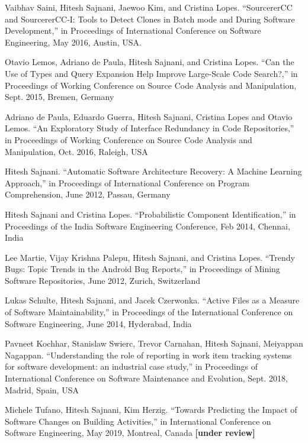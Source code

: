 \documentclass[a4paper]{article}
\begin{document}
\begin{small}
\begin{thebibliography}{}
Vaibhav Saini, Hitesh Sajnani, Jaewoo Kim, and Cristina Lopes. “SourcererCC and
SourcererCC-I: Tools to Detect Clones in Batch mode and During Software Development,”
in Proceedings of International Conference on Software Engineering, May 2016,
Austin, USA.

Otavio Lemos, Adriano de Paula, Hitesh Sajnani, and Cristina Lopes. “Can the Use of Types
and Query Expansion Help Improve Large-Scale Code Search?,” in Proceedings of
Working Conference on Source Code Analysis and Manipulation, Sept. 2015, Bremen,
Germany 

Adriano de Paula, Eduardo Guerra, Hitesh Sajnani, Cristina Lopes and Otavio Lemos. “An Exploratory Study of Interface Redundancy in Code Repositories,” in Proceedings of Working Conference on Source Code Analysis and Manipulation, Oct. 2016, Raleigh, USA

Hitesh Sajnani. “Automatic Software Architecture Recovery: A Machine Learning
Approach,” in Proceedings of International Conference on Program Comprehension, June
2012, Passau, Germany

Hitesh Sajnani and Cristina Lopes. “Probabilistic Component Identification,” in Proceedings
of the India Software Engineering Conference, Feb 2014, Chennai, India 

Lee Martie, Vijay Krishna Palepu, Hitesh Sajnani, and Cristina Lopes. “Trendy Bugs: Topic
Trends in the Android Bug Reports,” in Proceedings of Mining Software Repositories,
June 2012, Zurich, Switzerland

Lukas Schulte, Hitesh Sajnani, and Jacek Czerwonka. “Active Files as a Measure of
Software Maintainability,” in Proceedings of the International Conference on Software
Engineering, June 2014, Hyderabad, India 

Pavneet Kochhar, Stanislaw Swierc, Trevor Carnahan, Hitesh Sajnani, Meiyappan Nagappan. “Understanding the role of reporting in work item tracking systems for software development: an industrial case study,” in Proceedings of International Conference on Software Maintenance and Evolution, Sept. 2018, Madrid, Spain, USA 

Michele Tufano, Hitesh Sajnani, Kim Herzig. “Towards Predicting the Impact of Software Changes on Building Activities,” in International Conference on Software Engineering, May 2019, Montreal, Canada \textbf{[under review]}


\end{thebibliography}
\end{small}
\end{document}
